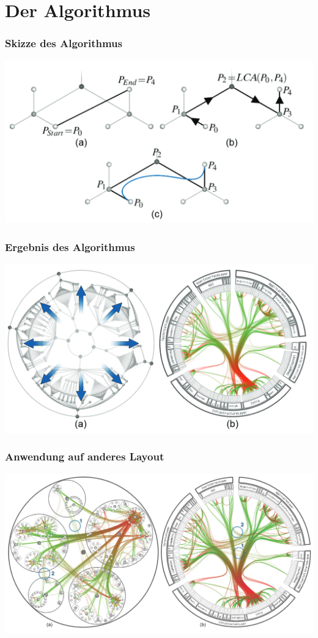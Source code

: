 \documentclass[11pt]{beamer}
\begin{document}
\section{Der Algorithmus}
\begin{frame}
\frametitle{Skizze des Algorithmus}
\includegraphics[scale=0.35]{./Algorithm_Scheme.png}
\end{frame}

\begin{frame}
\frametitle{Ergebnis des Algorithmus}
\includegraphics[scale=0.35]{./Algorithm_Result.png}
\end{frame}

\begin{frame}
\frametitle{Anwendung auf anderes Layout}
\includegraphics[scale=0.35]{./Algorithm_Result_OtherLayout.png}
\end{frame}
\end{document}
